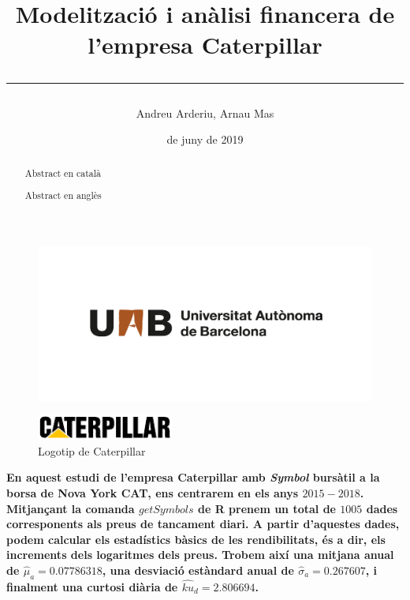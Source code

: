 \documentclass{article}
\title{\sffamily \bfseries Modelització i anàlisi financera de l'empresa Caterpillar \vspace{1em} \hrule}
\author{\sffamily Andreu Arderiu, Arnau Mas}
\date{\sffamily 14 de juny de 2019}
\numberwithin{table}{section}
\numberwithin{figure}{section}
\numberwithin{equation}{section}
\begin{document}
\begin{titlepage}
\clearpage
\thispagestyle{empty}
\maketitle	

\renewcommand{\abstractname}{\bfseries \sffamily Resum:}
\begin{abstract}
	Abstract en català
\end{abstract}

\renewcommand{\abstractname}{\bfseries \sffamily Abstract:}
\begin{abstract}
	Abstract en anglès
\end{abstract}

\begin{figure}[b]
	\thispagestyle{empty}
	\center \includegraphics[scale = 0.3]{uab}
\end{figure}
\end{titlepage}

\begin{figure}[H]
\centering \small \sffamily
\includegraphics[width=0.4\textwidth]{cat-logo}
\caption{Logotip de Caterpillar}
\end{figure}
\textbf{En aquest estudi de l'empresa Caterpillar amb \textit{Symbol} bursàtil a la borsa de Nova York CAT, ens centrarem en els anys $2015-2018$. Mitjançant la comanda $getSymbols$ de R prenem un total de $1005$ dades corresponents als preus de tancament diari. A partir d'aquestes dades, podem calcular els estadístics bàsics de les rendibilitats, és a dir, els increments dels logaritmes dels preus. Trobem així una mitjana anual de $\hat{\mu}_a=0.07786318$, una desviació estàndard anual de $\hat{\sigma}_a=0.267607$, i finalment una curtosi diària de $\hat{ku}_d=2.806694$. }
\end{document}
